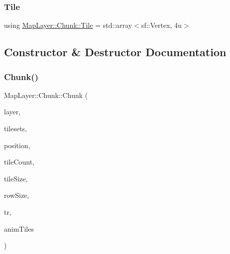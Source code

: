 \mbox{\label{classMapLayer_1_1Chunk_a2137a288bfd4120eb3e4db5934b802f3}} 
\subsubsection{\texorpdfstring{Tile}{Tile}}
{\footnotesize\ttfamily using \hyperlink{classMapLayer_1_1Chunk_a2137a288bfd4120eb3e4db5934b802f3}{Map\+Layer\+::\+Chunk\+::\+Tile} =  std\+::array$<$sf\+::\+Vertex, 4u$>$}



\subsection{Constructor \& Destructor Documentation}
\mbox{\label{classMapLayer_1_1Chunk_a793a265040a7e0e117d47463b5d1f762}} 
\subsubsection{\texorpdfstring{Chunk()}{Chunk()}\hspace{0.1cm}{\footnotesize\ttfamily [1/2]}}
{\footnotesize\ttfamily Map\+Layer\+::\+Chunk\+::\+Chunk (\begin{DoxyParamCaption}\item[{const tmx\+::\+Tile\+Layer \&}]{layer,  }\item[{std\+::vector$<$ const tmx\+::\+Tileset $\ast$$>$}]{tilesets,  }\item[{const sf\+::\+Vector2f \&}]{position,  }\item[{const sf\+::\+Vector2f \&}]{tile\+Count,  }\item[{const sf\+::\+Vector2u \&}]{tile\+Size,  }\item[{std\+::size\+\_\+t}]{row\+Size,  }\item[{\hyperlink{classMapLayer_a64011087426e436e3cb8374570378d68}{Texture\+Resource} \&}]{tr,  }\item[{const std\+::map$<$ std\+::uint32\+\_\+t, tmx\+::\+Tileset\+::\+Tile $>$ \&}]{anim\+Tiles }\end{DoxyParamCaption})\hspace{0.3cm}{\ttfamily [inline]}}

